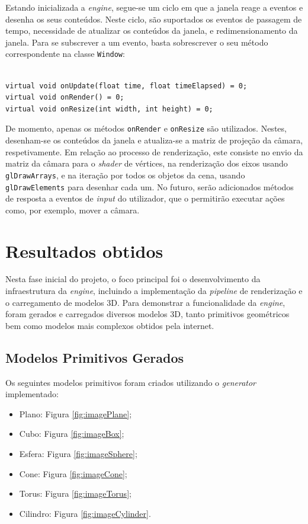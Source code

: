 \documentclass[12pt, a4paper]{article}
\begin{document}
Estando inicializada a \emph{engine}, segue-se um ciclo em que a janela reage a eventos e desenha os
seus conteúdos. Neste ciclo, são suportados os eventos de passagem de tempo, necessidade de
atualizar os conteúdos da janela, e redimensionamento da janela. Para se subscrever a um evento,
basta sobrescrever o seu método correspondente na classe \texttt{Window}:

\lstset{language=c++}
\begin{lstlisting}

virtual void onUpdate(float time, float timeElapsed) = 0;
virtual void onRender() = 0;
virtual void onResize(int width, int height) = 0;
\end{lstlisting}

De momento, apenas os métodos \texttt{onRender} e \texttt{onResize} são utilizados. Nestes,
desenham-se os conteúdos da janela e atualiza-se a matriz de projeção da câmara, respetivamente. Em
relação ao processo de renderização, este consiste no envio da matriz da câmara para o \emph{shader}
de vértices, na renderização dos eixos usando \texttt{glDrawArrays}, e na iteração por todos os
objetos da cena, usando \texttt{glDrawElements} para desenhar cada um. No futuro, serão adicionados
métodos de resposta a eventos de \emph{input} do utilizador, que o permitirão executar ações como,
por exemplo, mover a câmara.

\section{Resultados obtidos}

Nesta fase inicial do projeto, o foco principal foi o desenvolvimento da infraestrutura da
\emph{engine}, incluindo a implementação da \emph{pipeline} de renderização e o carregamento de
modelos 3D. Para demonstrar a funcionalidade da \emph{engine}, foram gerados e carregados diversos
modelos 3D, tanto primitivos geométricos bem como modelos mais complexos obtidos pela internet.

\subsection{Modelos Primitivos Gerados}

Os seguintes modelos primitivos foram criados utilizando o \emph{generator} implementado:

\begin{itemize}
    \item Plano: Figura \ref{fig:imagePlane};
    \item Cubo: Figura \ref{fig:imageBox};
    \item Esfera: Figura \ref{fig:imageSphere};
    \item Cone: Figura \ref{fig:imageCone};
    \item Torus: Figura \ref{fig:imageTorus};
    \item Cilindro: Figura \ref{fig:imageCylinder}.
\end{itemize}
\end{document}
